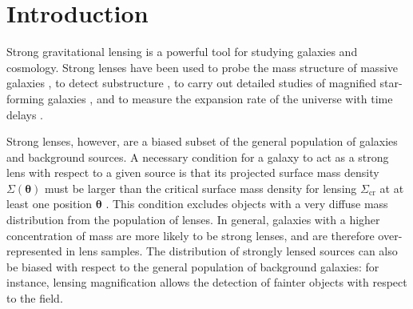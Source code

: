 \documentclass{aa}
\begin{document}
   \maketitle
%

\section{Introduction}\label{sect:intro}

Strong gravitational lensing is a powerful tool for studying galaxies and cosmology.
Strong lenses have been used to probe the mass structure of massive galaxies \citep{Aug++10, ORF14, Son++15, Sha++21}, to detect substructure \citep{Veg++12, Hez++16, Nie++20}, to carry out detailed studies of magnified star-forming galaxies \citep{Jon++13}, and to measure the expansion rate of the universe with time delays \citep[see][for a review]{T+M16}.

Strong lenses, however, are a biased subset of the general population of galaxies and background sources.
A necessary condition for a galaxy to act as a strong lens with respect to a given source is that its projected surface mass density $\Sigma(\boldsymbol\theta)$ must be larger than the critical surface mass density for lensing $\Sigma_{\mathrm{cr}}$ at at least one position $\boldsymbol\theta$ \citep{SEF92}.
This condition excludes objects with a very diffuse mass distribution from the population of lenses.
In general, galaxies with a higher concentration of mass are more likely to be strong lenses, and are therefore over-represented in lens samples.
The distribution of strongly lensed sources can also be biased with respect to the general population of background galaxies: for instance, lensing magnification allows the detection of fainter objects with respect to the field.

\end{document}
